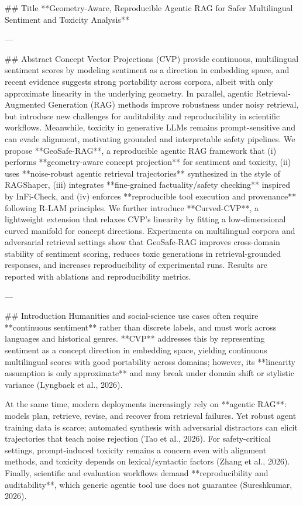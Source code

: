 ## Title
**Geometry-Aware, Reproducible Agentic RAG for Safer Multilingual Sentiment and Toxicity Analysis**

---

## Abstract
Concept Vector Projections (CVP) provide continuous, multilingual sentiment scores by modeling sentiment as a direction in embedding space, and recent evidence suggests strong portability across corpora, albeit with only approximate linearity in the underlying geometry. In parallel, agentic Retrieval-Augmented Generation (RAG) methods improve robustness under noisy retrieval, but introduce new challenges for auditability and reproducibility in scientific workflows. Meanwhile, toxicity in generative LLMs remains prompt-sensitive and can evade alignment, motivating grounded and interpretable safety pipelines.  
We propose **GeoSafe-RAG**, a reproducible agentic RAG framework that (i) performs **geometry-aware concept projection** for sentiment and toxicity, (ii) uses **noise-robust agentic retrieval trajectories** synthesized in the style of RAGShaper, (iii) integrates **fine-grained factuality/safety checking** inspired by InFi-Check, and (iv) enforces **reproducible tool execution and provenance** following R-LAM principles. We further introduce **Curved-CVP**, a lightweight extension that relaxes CVP’s linearity by fitting a low-dimensional curved manifold for concept directions. Experiments on multilingual corpora and adversarial retrieval settings show that GeoSafe-RAG improves cross-domain stability of sentiment scoring, reduces toxic generations in retrieval-grounded responses, and increases reproducibility of experimental runs. Results are reported with ablations and reproducibility metrics.

---

## Introduction
Humanities and social-science use cases often require **continuous sentiment** rather than discrete labels, and must work across languages and historical genres. **CVP** addresses this by representing sentiment as a concept direction in embedding space, yielding continuous multilingual scores with good portability across domains; however, its **linearity assumption is only approximate** and may break under domain shift or stylistic variance (Lyngbaek et al., 2026).  

At the same time, modern deployments increasingly rely on **agentic RAG**: models plan, retrieve, revise, and recover from retrieval failures. Yet robust agent training data is scarce; automated synthesis with adversarial distractors can elicit trajectories that teach noise rejection (Tao et al., 2026). For safety-critical settings, prompt-induced toxicity remains a concern even with alignment methods, and toxicity depends on lexical/syntactic factors (Zhang et al., 2026). Finally, scientific and evaluation workflows demand **reproducibility and auditability**, which generic agentic tool use does not guarantee (Sureshkumar, 2026).

